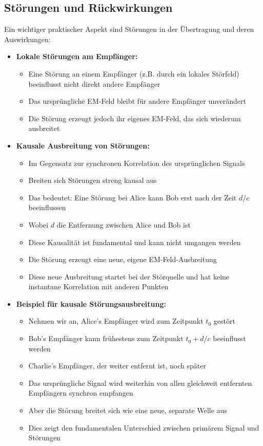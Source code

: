 \documentclass[12pt,a4paper]{article}
\begin{document}
	\subsection{Störungen und Rückwirkungen}
	Ein wichtiger praktischer Aspekt sind Störungen in der Übertragung und deren Auswirkungen:
	
	\begin{itemize}
		\item \textbf{Lokale Störungen am Empfänger:}
		\begin{itemize}
			\item Eine Störung an einem Empfänger (z.B. durch ein lokales Störfeld) beeinflusst nicht direkt andere Empfänger
			\item Das ursprüngliche EM-Feld bleibt für andere Empfänger unverändert
			\item Die Störung erzeugt jedoch ihr eigenes EM-Feld, das sich wiederum ausbreitet
		\end{itemize}
		
		\item \textbf{Kausale Ausbreitung von Störungen:}
		\begin{itemize}
			\item Im Gegensatz zur synchronen Korrelation des ursprünglichen Signals
			\item Breiten sich Störungen streng kausal aus
			\item Das bedeutet: Eine Störung bei Alice kann Bob erst nach der Zeit $d/c$ beeinflussen
			\item Wobei $d$ die Entfernung zwischen Alice und Bob ist
			\item Diese Kausalität ist fundamental und kann nicht umgangen werden
			\item Die Störung erzeugt eine neue, eigene EM-Feld-Ausbreitung
			\item Diese neue Ausbreitung startet bei der Störquelle und hat keine instantane Korrelation mit anderen Punkten
		\end{itemize}
		
		\item \textbf{Beispiel für kausale Störungsausbreitung:}
		\begin{itemize}
			\item Nehmen wir an, Alice's Empfänger wird zum Zeitpunkt $t_0$ gestört
			\item Bob's Empfänger kann frühestens zum Zeitpunkt $t_0 + d/c$ beeinflusst werden
			\item Charlie's Empfänger, der weiter entfernt ist, noch später
			\item Das ursprüngliche Signal wird weiterhin von allen gleichweit entfernten Empfängern synchron empfangen
			\item Aber die Störung breitet sich wie eine neue, separate Welle aus
			\item Dies zeigt den fundamentalen Unterschied zwischen primärem Signal und Störungen
		\end{itemize}
		

\end{itemize}
\end{document}
